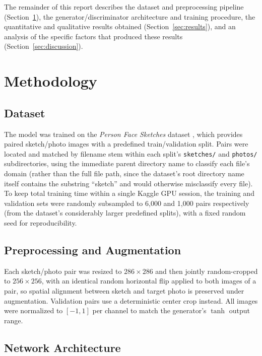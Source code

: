 \documentclass[conference]{IEEEtran}
\begin{document}
The remainder of this report describes the dataset and preprocessing pipeline
(Section~\ref{sec:methodology}), the generator/discriminator architecture and training
procedure, the quantitative and qualitative results obtained
(Section~\ref{sec:results}), and an analysis of the specific factors that produced these
results (Section~\ref{sec:discussion}).

\section{Methodology}
\label{sec:methodology}

\subsection{Dataset}

The model was trained on the \emph{Person Face Sketches} dataset \cite{sketchdataset},
which provides paired sketch/photo images with a predefined train/validation split. Pairs
were located and matched by filename stem within each split's \texttt{sketches/} and
\texttt{photos/} subdirectories, using the immediate parent directory name to classify
each file's domain (rather than the full file path, since the dataset's root directory
name itself contains the substring ``sketch'' and would otherwise misclassify every
file). To keep total training time within a single Kaggle GPU session, the training and
validation sets were randomly subsampled to 6{,}000 and 1{,}000 pairs respectively (from
the dataset's considerably larger predefined splits), with a fixed random seed for
reproducibility.

\subsection{Preprocessing and Augmentation}

Each sketch/photo pair was resized to $286\times286$ and then jointly random-cropped to
$256\times256$, with an identical random horizontal flip applied to both images of a
pair, so spatial alignment between sketch and target photo is preserved under
augmentation. Validation pairs use a deterministic center crop instead. All images were
normalized to $[-1,1]$ per channel to match the generator's $\tanh$ output range.

\subsection{Network Architecture}
\end{document}

